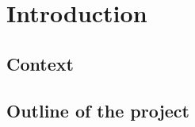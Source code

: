 \chapter{Introduction}

\lipsum[1]

\section{Context}
\lipsum[1]


\section{Outline of the project}
\lipsum[1]